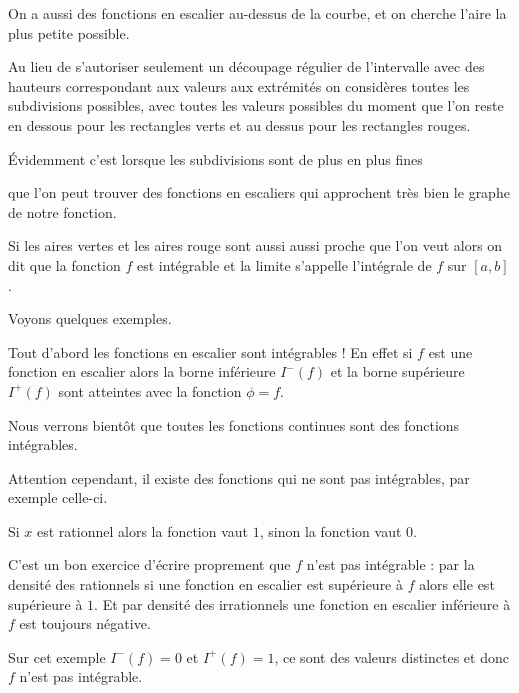 On a aussi des fonctions en escalier au-dessus de la courbe, et on cherche l'aire la plus petite possible.

\change

Au lieu de s'autoriser seulement un découpage régulier de l'intervalle avec des hauteurs correspondant
aux valeurs aux extrémités on considères toutes les subdivisions possibles, avec toutes les valeurs possibles
du moment que l'on reste en dessous pour les rectangles verts et au dessus pour les rectangles rouges.

\change

Évidemment c'est lorsque les subdivisions sont de plus en plus fines 

\change

que l'on peut trouver des fonctions en escaliers
qui approchent très bien le graphe de notre fonction.

Si les aires vertes et les aires rouge sont aussi aussi proche que l'on veut alors 
on dit que la fonction $f$ est intégrable et la limite
s'appelle l'intégrale de $f$ sur $[a,b]$.


\diapo

Voyons quelques exemples.

Tout d'abord les fonctions en escalier sont intégrables ! En effet si $f$ est une fonction en escalier
alors la borne inférieure $I^-(f)$ et la borne supérieure $I^+(f)$ sont atteintes avec la fonction 
$\phi=f$. 


\change

Nous verrons bientôt que toutes les fonctions continues sont des fonctions intégrables.


\change


Attention cependant, il existe des fonctions qui ne sont pas intégrables, par exemple celle-ci.

\change

Si $x$ est rationnel alors la fonction vaut $1$, sinon la fonction vaut $0$.

\change

C'est un bon exercice d'écrire proprement que $f$ n'est pas intégrable :
par la densité des rationnels si une fonction en escalier est supérieure à $f$ alors elle est supérieure à $1$.
Et par densité des irrationnels une fonction en escalier inférieure à $f$ est toujours négative.

Sur cet exemple $I^-(f)=0$ et $I^+(f)=1$, ce sont des valeurs distinctes et donc $f$ n'est pas intégrable.



